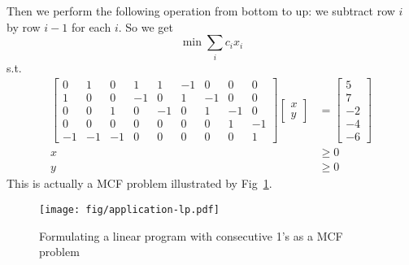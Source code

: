 \documentclass[UTF8,a4paper]{ctexart}
\begin{document}
Then we perform the following operation from bottom to up:
we subtract row $i$ by row $i-1$ for each $i$.
So we get
\[
    \min \sum_i c_i x_i
\]
s.t.
\begin{align*}
    \begin{bmatrix}
        0&1&0&1&1& -1&0&0&0\\
        1&0&0&-1&0& 1&-1&0&0\\
        0&0&1&0&-1& 0&1&-1&0\\
        0&0&0&0&0& 0&0&1&-1\\
        -1&-1&-1&0&0& 0&0&0&1
    \end{bmatrix}
    \begin{bmatrix}
        x\\
        y
    \end{bmatrix}
    &=\begin{bmatrix}
        5\\
        7\\
        -2\\
        -4\\
        -6
    \end{bmatrix}
    \\ x&\geq 0
    \\ y&\geq 0
\end{align*}
This is actually a MCF problem illustrated by Fig~\ref{fig:app:lp}.

\begin{figure}
    \begin{center}
        \texttt{[image: fig/application-lp.pdf]}
    \end{center}
    \caption{Formulating a linear program with consecutive 1's as a MCF problem}
    \label{fig:app:lp}
\end{figure}
\end{document}
